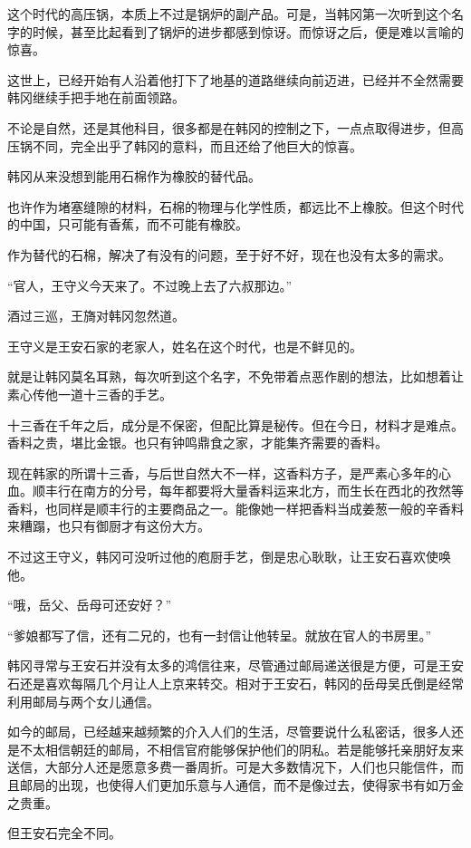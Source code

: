 这个时代的高压锅，本质上不过是锅炉的副产品。可是，当韩冈第一次听到这个名字的时候，甚至比起看到了锅炉的进步都感到惊讶。而惊讶之后，便是难以言喻的惊喜。

这世上，已经开始有人沿着他打下了地基的道路继续向前迈进，已经并不全然需要韩冈继续手把手地在前面领路。

不论是自然，还是其他科目，很多都是在韩冈的控制之下，一点点取得进步，但高压锅不同，完全出乎了韩冈的意料，而且还给了他巨大的惊喜。

韩冈从来没想到能用石棉作为橡胶的替代品。

也许作为堵塞缝隙的材料，石棉的物理与化学性质，都远比不上橡胶。但这个时代的中国，只可能有香蕉，而不可能有橡胶。

作为替代的石棉，解决了有没有的问题，至于好不好，现在也没有太多的需求。

“官人，王守义今天来了。不过晚上去了六叔那边。”

酒过三巡，王旖对韩冈忽然道。

王守义是王安石家的老家人，姓名在这个时代，也是不鲜见的。

就是让韩冈莫名耳熟，每次听到这个名字，不免带着点恶作剧的想法，比如想着让素心传他一道十三香的手艺。

十三香在千年之后，成分是不保密，但配比算是秘传。但在今日，材料才是难点。香料之贵，堪比金银。也只有钟鸣鼎食之家，才能集齐需要的香料。

现在韩家的所谓十三香，与后世自然大不一样，这香料方子，是严素心多年的心血。顺丰行在南方的分号，每年都要将大量香料运来北方，而生长在西北的孜然等香料，也同样是顺丰行的主要商品之一。能像她一样把香料当成姜葱一般的辛香料来糟蹋，也只有御厨才有这份大方。

不过这王守义，韩冈可没听过他的庖厨手艺，倒是忠心耿耿，让王安石喜欢使唤他。

“哦，岳父、岳母可还安好？”

“爹娘都写了信，还有二兄的，也有一封信让他转呈。就放在官人的书房里。”

韩冈寻常与王安石并没有太多的鸿信往来，尽管通过邮局递送很是方便，可是王安石还是喜欢每隔几个月让人上京来转交。相对于王安石，韩冈的岳母吴氏倒是经常利用邮局与两个女儿通信。

如今的邮局，已经越来越频繁的介入人们的生活，尽管要说什么私密话，很多人还是不太相信朝廷的邮局，不相信官府能够保护他们的阴私。若是能够托亲朋好友来送信，大部分人还是愿意多费一番周折。可是大多数情况下，人们也只能信件，而且邮局的出现，也使得人们更加乐意与人通信，而不是像过去，使得家书有如万金之贵重。

但王安石完全不同。

